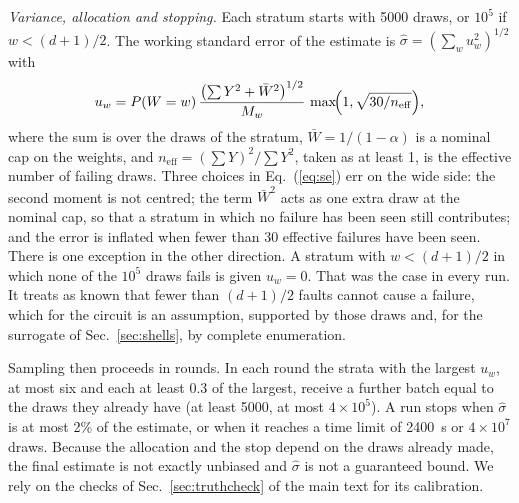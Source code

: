 \documentclass[aps,pre,onecolumn,superscriptaddress,nofootinbib,10pt]{revtex4-2}
\begin{document}
\emph{Variance, allocation and stopping.} Each stratum starts with 5000 draws, or $10^5$ if $w<(d+1)/2$. The working standard error of the estimate is $\hat\sigma=(\sum_wu_w^2)^{1/2}$ with
\begin{equation}
u_w=P(W=w)\,\frac{\bigl(\sum Y^2+\bar W^2\bigr)^{1/2}}{M_w}\,\max\!\Bigl(1,\sqrt{30/n_{\mathrm{eff}}}\Bigr),\label{eq:se}
\end{equation}
where the sum is over the draws of the stratum, $\bar W=1/(1-\alpha)$ is a nominal cap on the weights, and $n_{\mathrm{eff}}=(\sum Y)^2/\sum Y^2$, taken as at least 1, is the effective number of failing draws. Three choices in Eq.~(\ref{eq:se}) err on the wide side: the second moment is not centred; the term $\bar W^2$ acts as one extra draw at the nominal cap, so that a stratum in which no failure has been seen still contributes; and the error is inflated when fewer than 30 effective failures have been seen. There is one exception in the other direction. A stratum with $w<(d+1)/2$ in which none of the $10^5$ draws fails is given $u_w=0$. That was the case in every run. It treats as known that fewer than $(d+1)/2$ faults cannot cause a failure, which for the circuit is an assumption, supported by those draws and, for the surrogate of Sec.~\ref{sec:shells}, by complete enumeration.

Sampling then proceeds in rounds. In each round the strata with the largest $u_w$, at most six and each at least 0.3 of the largest, receive a further batch equal to the draws they already have (at least 5000, at most $4\times10^5$). A run stops when $\hat\sigma$ is at most 2\% of the estimate, or when it reaches a time limit of 2400~s or $4\times10^7$ draws. Because the allocation and the stop depend on the draws already made, the final estimate is not exactly unbiased and $\hat\sigma$ is not a guaranteed bound. We rely on the checks of Sec.~\ref{sec:truthcheck} of the main text for its calibration.
\end{document}

